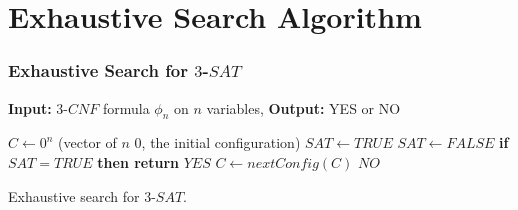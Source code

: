 \documentclass[handout]{beamer}
\begin{document}

\section{Exhaustive Search Algorithm}
\begin{frame}[fragile]
	\frametitle{Exhaustive Search for $3$-$SAT$}
	
\textbf{Input:} $3$-$CNF$ formula $\phi_n$ on $n$ variables, \textbf{Output:} YES or NO 

\medskip

\begin{algorithm}[H]
\begin{algorithmic}[1]
\STATE $C \gets 0^n$ (vector of $n$ 0, the initial configuration)
	\STATE $SAT \gets TRUE$
			\STATE $SAT \gets FALSE$
		\ENDIF
	\ENDFOR	
	\STATE \textbf{if} $SAT = TRUE$ \textbf{then return} $YES$
	\STATE $C \gets nextConfig(C)$
\ENDFOR
\RETURN $NO$
\end{algorithmic}
\caption{Exhaustive search for $3$-$SAT$.}
\label{alg:seq}
\end{algorithm}
	
\end{frame}
\end{document}
